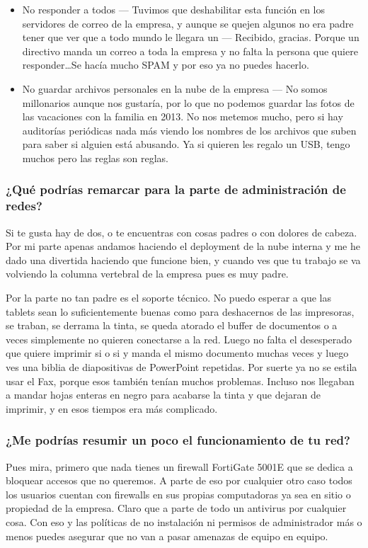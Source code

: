 \documentclass[../main.tex]{subfiles}
\begin{document}
\begin{itemize}
    \item No responder a todos --- Tuvimos que deshabilitar esta función en los servidores de correo de la empresa, y aunque se quejen algunos no era padre tener que ver que a todo mundo le llegara un --- Recibido, gracias. Porque un directivo manda un correo a toda la empresa y no falta la persona que quiere responder\ldots Se hacía mucho SPAM y por eso ya no puedes hacerlo.
    \item No guardar archivos personales en la nube de la empresa --- No somos millonarios aunque nos gustaría, por lo que no podemos guardar las fotos de las vacaciones con la familia en 2013. No nos metemos mucho, pero si hay auditorías periódicas nada más viendo los nombres de los archivos que suben para saber si alguien está abusando. Ya si quieren les regalo un USB, tengo muchos pero las reglas son reglas.
\end{itemize}

\subsubsection*{¿Qué podrías remarcar para la parte de administración de redes?}
Si te gusta hay de dos, o te encuentras con cosas padres o con dolores de cabeza. Por mi parte apenas andamos haciendo el deployment de la nube interna y me he dado una divertida haciendo que funcione bien, y cuando ves que tu trabajo se va volviendo la columna vertebral de la empresa pues es muy padre.

\medskip

Por la parte no tan padre es el soporte técnico. No puedo esperar a que las tablets sean lo suficientemente buenas como para deshacernos de las impresoras, se traban, se derrama la tinta, se queda atorado el buffer de documentos o a veces simplemente no quieren conectarse a la red. Luego no falta el desesperado que quiere imprimir si o si y manda el mismo documento muchas veces y luego ves una biblia de diapositivas de PowerPoint repetidas. Por suerte ya no se estila usar el Fax, porque esos también tenían muchos problemas. Incluso nos llegaban a mandar hojas enteras en negro para acabarse la tinta y que dejaran de imprimir, y en esos tiempos era más complicado.

\subsubsection*{¿Me podrías resumir un poco el funcionamiento de tu red?}

Pues mira, primero que nada tienes un firewall FortiGate 5001E que se dedica a bloquear accesos que no queremos. A parte de eso por cualquier otro caso todos los usuarios cuentan con firewalls en sus propias computadoras ya sea en sitio o propiedad de la empresa. Claro que a parte de todo un antivirus por cualquier cosa. Con eso y las políticas de no instalación ni permisos de administrador más o menos puedes asegurar que no van a pasar amenazas de equipo en equipo.
\end{document}
